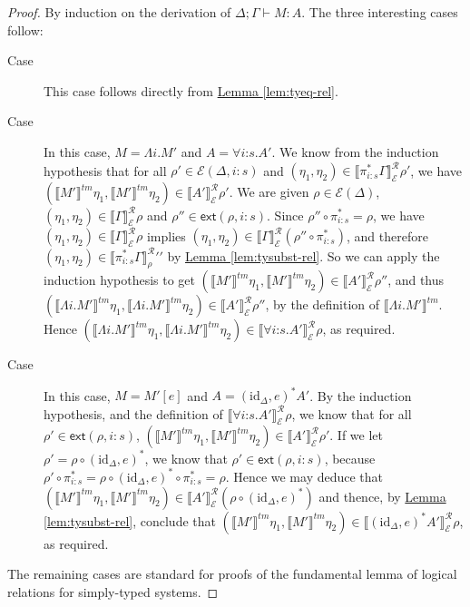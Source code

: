 \documentclass[natbib,preprint]{sigplanconf}
\newcommand{\id}{\mathrm{id}}
\newcommand{\relEnv}[1]{\mathcal{#1}}
\newcommand{\tmSem}[1]{\llbracket #1 \rrbracket^{\mathit{tm}}}
\newcommand{\rsem}[3]{\llbracket #1 \rrbracket^{\mathcal{R}}_{#2}{#3}}
\newcommand{\extends}[2]{\mathsf{ext}(#1,#2)}
\newcommand{\lemref}[1]{\hyperref[#1]{Lemma \ref*{#1}}}
\begin{document}
\begin{proof}
  By induction on the derivation of $\Delta; \Gamma \vdash M : A$. The
  three interesting cases follow:
  \begin{description}
  \item[Case ] This case follows directly from
    \lemref{lem:tyeq-rel}.
  \item[Case ] In this case, $M = \Lambda i.M'$ and
    $A = \forall i\mathord:s. A'$. We know from the induction
    hypothesis that for all $\rho' \in \relEnv{E}(\Delta, i:s)$ and
    $(\eta_1,\eta_2) \in \rsem{\pi_{i:s}^*\Gamma}{\relEnv{E}}\rho'$,
    we have $(\tmSem{M'}\eta_1,\tmSem{M'}\eta_2) \in
    \rsem{A'}{\relEnv{E}}\rho'$. We are given $\rho \in
    \relEnv{E}(\Delta)$, $(\eta_1,\eta_2) \in
    \rsem{\Gamma}{\relEnv{E}}\rho$ and $\rho'' \in
    \extends{\rho}{i:s}$. Since $\rho'' \circ \pi^*_{i:s} = \rho$, we
    have $(\eta_1,\eta_2) \in \rsem{\Gamma}{\relEnv{E}}\rho$ implies
    $(\eta_1,\eta_2) \in \rsem{\Gamma}{\relEnv{E}}{(\rho'' \circ
      \pi^*_{i:s})}$, and therefore $(\eta_1,\eta_2) \in
    \rsem{\pi_{i:s}^*\Gamma}\rho''$ by \lemref{lem:tysubst-rel}. So we
    can apply the induction hypothesis to get $(\tmSem{M'}\eta_1,
    \tmSem{M'}\eta_2) \in \rsem{A'}{\relEnv{E}}\rho''$, and thus
    $(\tmSem{\Lambda i.M'}\eta_1,\tmSem{\Lambda i.M'}\eta_2) \in
    \rsem{A'}{\relEnv{E}}\rho''$, by the definition of $\tmSem{\Lambda
      i. M'}$. Hence $(\tmSem{\Lambda i.M'}\eta_1,\tmSem{\Lambda
      i.M'}\eta_2) \in \rsem{\forall
      i\mathord:s. A'}{\relEnv{E}}\rho$, as required.
  \item[Case ] In this case, $M = M'[e]$ and $A =
    (\id_\Delta, e)^*A'$. By the induction hypothesis, and the
    definition of $\rsem{\forall i\mathord:s.A'}{\relEnv{E}}\rho$, we
    know that for all $\rho' \in \extends{\rho}{i:s}$,
    $(\tmSem{M'}\eta_1, \tmSem{M'}\eta_2) \in
    \rsem{A'}{\relEnv{E}}\rho'$. If we let $\rho' = \rho \circ
    (\id_\Delta, e)^*$, we know that $\rho' \in \extends{\rho}{i:s}$,
    because $\rho' \circ \pi^*_{i:s} = \rho \circ (\id_\Delta, e)^*
    \circ \pi^*_{i:s} = \rho$. Hence we may deduce that
    $(\tmSem{M'}\eta_1,\tmSem{M'}\eta_2) \in
    \rsem{A'}{\relEnv{E}}{(\rho \circ (\id_\Delta,e)^*)}$ and thence,
    by \lemref{lem:tysubst-rel}, conclude that $(\tmSem{M'}\eta_1,
    \tmSem{M'}\eta_2) \in \rsem{(\id_\Delta,e)^*A'}{\relEnv{E}}\rho$,
    as required.
  \end{description}
  The remaining cases are standard for proofs of the fundamental lemma
  of logical relations for simply-typed systems.
\end{proof}
\end{document}
